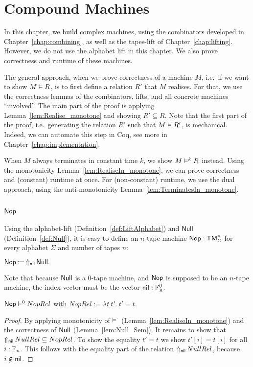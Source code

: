 \chapter{Compound Machines}
\label{cha:compound}

In this chapter, we build complex machines, using the combinators developed in Chapter~\ref{chap:combining}, as well as the tapes-lift of
Chapter~\ref{chap:lifting}.  However, we do not use the alphabet lift in this chapter.  We also prove correctness and runtime of these machines.

The general approach, when we prove correctness of a machine $M$, i.e.\ if we want to show $M \mathrel{\vDash} R$, is to first define a relation $R'$ that $M$
realises.  For that, we use the correctness lemmas of the combinators, lifts, and all concrete machines ``involved''.  The main part of the proof is
applying Lemma~\ref{lem:Realise_monotone} and showing $R' \subseteq R$.  Note that the first part of the proof, i.e.\ generating the relation $R'$
such that $M \mathrel{\vDash} R'$, is mechanical.  Indeed, we can automate this step in Coq, see more in Chapter~\ref{chap:implementation}.

When $M$ always terminates in constant time $k$, we show $M \mathrel{\vDash^{k}} R$ instead.  Using the monotonicity Lemma~\ref{lem:RealiseIn_monotone}, we
can prove correctness and (constant) runtime at once.  For (non-constant) runtime, we use the dual approach, using the anti-monotonicity
Lemma~\ref{lem:TerminatesIn_monotone}.

\section{$\Nop$}
\label{sec:Nop}

Using the alphabet-lift (Definition~\ref{def:LiftAlphabet}) and $\mathsf{Null}$ (Definition~\ref{def:Null}), it is easy to define an $n$-tape machine
$\mathsf{Nop} : \mathsf{TM}_\Sigma^n$ for every alphabet $\Sigma$ and number of tapes $n$:
\begin{definition}[$\Nop$]
  $\mathsf{Nop} \mathop{:=} \mathop{\Uparrow_{\mathsf{nil}}} \mathsf{Null}.$
\end{definition}
Note that because $\mathsf{Null}$ is a 0-tape machine, and $\Nop$ is supposed to be an $n$-tape machine, the index-vector must be the vector
$\mathsf{nil} : \mathbb{F}_n^0$.

\begin{lemma}
  \label{lem:Nop_Sem}
  $\mathsf{Nop} \mathrel{\vDash^{0}} NopRel$ with $NopRel := \lambda t~t'.~t'=t$.
\end{lemma}
\begin{proof}
  By applying monotonicity of $\mathrel{\vDash^{\cdot}}$ (Lemma~\ref{lem:RealiseIn_monotone}) and the correctness of $\mathsf{Null}$ (Lemma~\ref{lem:Null_Sem}).  It
  remains to show that $\mathop{\Uparrow_{\mathsf{nil}}} NullRel \subseteq NopRel$.  To show the equality $t'=t$ we show $t'[i]=t[i]$ for all $i:\mathbb{F}_n$.  This
  follows with the equality part of the relation $\mathop{\Uparrow_{\mathsf{nil}}} NullRel$, because $i \notin \mathsf{nil}$.
\end{proof}

